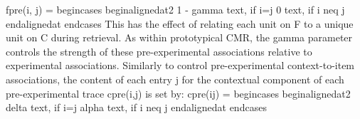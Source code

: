 {}\markdownRendererDollarSign{}\markdownRendererDollarSign{}f\markdownRendererUnderscore{}\markdownRendererLeftBrace{}pre(i, j)\markdownRendererRightBrace{} = \markdownRendererBackslash{}begin\markdownRendererLeftBrace{}cases\markdownRendererRightBrace{} \markdownRendererBackslash{}begin\markdownRendererLeftBrace{}alignedat\markdownRendererRightBrace{}\markdownRendererLeftBrace{}2\markdownRendererRightBrace{} 1 - \markdownRendererBackslash{}gamma \markdownRendererBackslash{}text\markdownRendererLeftBrace{}, if \markdownRendererRightBrace{} i=j \markdownRendererBackslash{} 0 \markdownRendererBackslash{}text\markdownRendererLeftBrace{}, if \markdownRendererRightBrace{} i \markdownRendererBackslash{}neq j\markdownRendererBackslash{} \markdownRendererBackslash{}end\markdownRendererLeftBrace{}alignedat\markdownRendererRightBrace{} \markdownRendererBackslash{}end\markdownRendererLeftBrace{}cases\markdownRendererRightBrace{}\markdownRendererDollarSign{}\markdownRendererDollarSign{}\markdownRendererInterblockSeparator
{}This has the effect of relating each unit on \markdownRendererDollarSign{}F\markdownRendererDollarSign{} to a unique unit on \markdownRendererDollarSign{}C\markdownRendererDollarSign{} during retrieval. As within prototypical CMR, the \markdownRendererDollarSign{}\markdownRendererBackslash{}gamma\markdownRendererDollarSign{} parameter controls the strength of these pre-experimental associations relative to experimental associations.\markdownRendererInterblockSeparator
{}Similarly to control pre-experimental context-to-item associations, the content of each entry \markdownRendererDollarSign{}j\markdownRendererDollarSign{} for the contextual component of each pre-experimental trace \markdownRendererDollarSign{}c\markdownRendererUnderscore{}\markdownRendererLeftBrace{}pre(i,j)\markdownRendererRightBrace{}\markdownRendererDollarSign{} is set by:\markdownRendererInterblockSeparator
{}\markdownRendererDollarSign{}\markdownRendererDollarSign{}c\markdownRendererUnderscore{}\markdownRendererLeftBrace{}pre(ij)\markdownRendererRightBrace{} = \markdownRendererBackslash{}begin\markdownRendererLeftBrace{}cases\markdownRendererRightBrace{} \markdownRendererBackslash{}begin\markdownRendererLeftBrace{}alignedat\markdownRendererRightBrace{}\markdownRendererLeftBrace{}2\markdownRendererRightBrace{} \markdownRendererBackslash{}delta \markdownRendererBackslash{}text\markdownRendererLeftBrace{}, if \markdownRendererRightBrace{} i=j \markdownRendererBackslash{} \markdownRendererBackslash{}alpha \markdownRendererBackslash{}text\markdownRendererLeftBrace{}, if \markdownRendererRightBrace{} i \markdownRendererBackslash{}neq j\markdownRendererBackslash{} \markdownRendererBackslash{}end\markdownRendererLeftBrace{}alignedat\markdownRendererRightBrace{} \markdownRendererBackslash{}end\markdownRendererLeftBrace{}cases\markdownRendererRightBrace{}\markdownRendererDollarSign{}\markdownRendererDollarSign{}\markdownRendererInterblockSeparator
